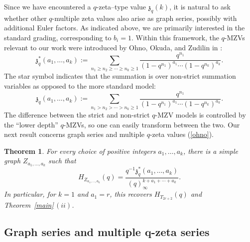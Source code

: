 \documentclass[10pt,a4paper]{amsart}
\numberwithin{equation}{section}
\newtheorem{Theorem}{Theorem}[section]
\theoremstyle{definition}
\begin{document}
Since we have encountered a $q$-zeta–type value $\mathfrak{z}_q(k)$, it is natural to ask whether other $q$-multiple zeta values also arise as graph series, possibly with additional Euler factors.
As indicated above, we are primarily interested in the standard grading, corresponding to $b_i = 1$.
Within this framework, the $q$-MZVs relevant to our work were introduced by Ohno, Okuda, and Zudilin in \cite{Ohno}:
\begin{equation} \label{ohno}
\mathfrak{z}_q^*(a_1,\dots,a_k):=\sum_{n_1 \geq n_2 \geq \cdots \geq n_k \geq 1} \frac{q^{n_1}}{(1-q^{n_1})^{a_1} \cdots (1-q^{n_k})^{a_k}}.
\end{equation}
The star symbol indicates that the summation is over non-strict summation variables as opposed to the more standard model:
\[
\mathfrak{z}_q(a_1,\dots,a_k):=\sum_{n_1 > n_2 > \cdots > n_k \geq 1} \frac{q^{n_1}}{(1-q^{n_1})^{a_1} \cdots (1-q^{n_k})^{a_k}}.
\]
The difference between the strict and non-strict $q$-MZV models is controlled by the ``lower depth'' $q$-MZVs, so one can easily transform between the two.
Our next result concerns graph series and multiple $q$-zeta values (\ref{ohno}).

\begin{Theorem} \label{qmzv} For every choice of positive integers $a_1,\dots,a_k$, there is a simple graph $Z_{a_1,\dots,a_k}$ such that
\[
H_{Z_{a_1,\dots,a_k}}(q)=\frac{q^{-1} \mathfrak{z}_q^*(a_1,\dots,a_k)}{(q)^{k+a_1+\cdots +a_k}_\infty}.
\]
In particular, for $k=1$ and $a_1=r$, this recovers $H_{T_{2r+2}}(q)$ and Theorem~{\rm \ref{main}}\,$(ii)$.
\end{Theorem}

\subsection[Graph series and multiple q-zeta series]{Graph series and multiple $\boldsymbol{q}$-zeta series}\label{section2.4}
\end{document}

